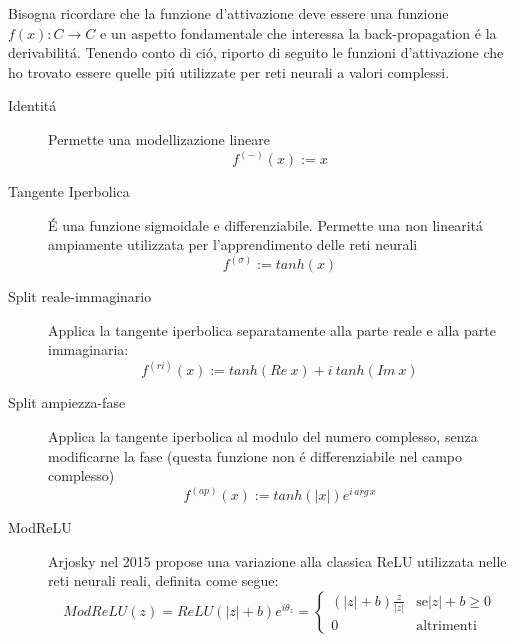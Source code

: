 \documentclass[a4paper,12pt]{report}
\begin{document}
 Bisogna ricordare che la funzione d'attivazione deve essere una funzione $f(x):C \to C$ e un aspetto fondamentale che interessa la back-propagation \'e la derivabilit\'a. 
 Tenendo conto di ci\'o, riporto di seguito le funzioni d'attivazione che ho trovato essere quelle pi\'u utilizzate per reti neurali a valori complessi.
 \begin{description}
 \item[Identit\'a]
 Permette una modellizazione lineare
 \begin{equation}
  f^{\left(-\right) }\left(x\right) := x
 \end{equation}

 \item[Tangente Iperbolica]
 \'E una funzione sigmoidale e differenziabile. Permette una non linearit\'a ampiamente utilizzata per l'apprendimento delle reti neurali
 \begin{equation}
  f^{\left(\sigma\right) } := tanh\left( x\right)
 \end{equation}

 \item[Split reale-immaginario]
 Applica la tangente iperbolica separatamente alla parte reale e alla parte immaginaria:
 \begin{equation}
  f^{\left( ri\right)} \left( x\right) := tanh\left( Re \ x\right) +i \ tanh\left( Im \ x\right)
 \end{equation}

 \item[Split ampiezza-fase]
 Applica la tangente iperbolica al modulo del numero complesso, senza modificarne la fase (questa funzione non \'e differenziabile nel campo complesso)
 \begin{equation}
  f^{\left( ap\right) } \left( x\right) := tanh\left( \left| x\right|\right) e^{i \, arg \, x}
 \end{equation}
 
 \item[ModReLU]
 Arjosky nel 2015 propose una variazione alla classica ReLU utilizzata nelle reti neurali reali, definita come segue:
 \begin{equation}
  ModReLU\left( z\right) = ReLU\left( \left| z\right|+b\right) e^{i\theta_z} = \begin{cases}
                                                                                               \left(\left| z\right| +b\right) \frac{z}{\left| z\right|} & \mbox{se} \left| z\right| +b \ge 0 \\
                                                                                0 & \mbox{altrimenti}
                                                                

\end{cases}
\end{equation}
\end{description}
\end{document}
